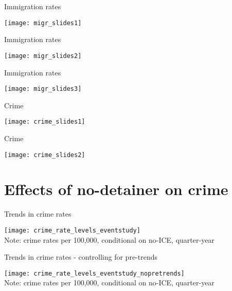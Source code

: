 \documentclass[xcolor=pdftex,dvipsnames,table]{beamer}
\begin{document}
\begin{frame}{Immigration rates}
\begin{center}
\texttt{[image: migr\_slides1]}
\end{center}
\end{frame}

\begin{frame}{Immigration rates}
\begin{center}
\texttt{[image: migr\_slides2]}
\end{center}
\end{frame}

\begin{frame}{Immigration rates}
\begin{center}
\texttt{[image: migr\_slides3]}
\end{center}
\end{frame}

\begin{frame}{Crime}
\begin{center}
\texttt{[image: crime\_slides1]}
\end{center}
\end{frame}

\begin{frame}{Crime}
\begin{center}
\texttt{[image: crime\_slides2]}
\end{center}
\end{frame}

\section{Effects of no-detainer on crime}
\begin{frame}{Trends in crime rates}
\begin{center}
\texttt{[image: crime\_rate\_levels\_eventstudy]}\\
\footnotesize{Note: crime rates per 100,000, conditional on no-ICE, quarter-year}
\end{center}
\end{frame}

\begin{frame}{Trends in crime rates - controlling for pre-trends}
\begin{center}
\texttt{[image: crime\_rate\_levels\_eventstudy\_nopretrends]}\\
\footnotesize{Note: crime rates per 100,000, conditional on no-ICE, quarter-year}
\end{center}
\end{frame}

\end{document}
